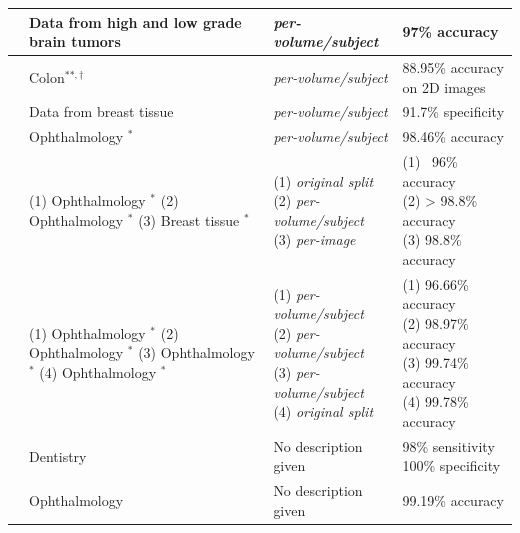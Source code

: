 \documentclass[fleqn,10pt]{wlscirep}
\begin{document}
\begin{table}[ht]
\begin{tabular}{|c|l|l|l|}
\hline
\cite{gesperger2020improved} & Data from high and low grade brain tumors & \textit{per-volume/subject} & 97\% accuracy \\
\hline
\cite{saratxaga2021characterization} & Colon$^{\ast \ast, \dagger}$ & \textit{per-volume/subject} & 88.95\% accuracy on 2D images \\
\hline
\cite{singla2019automated} & Data from breast tissue & \textit{per-volume/subject} & 91.7\% specificity \\
\hline
\cite{chetoui2020deep} & Ophthalmology \cite{kermany2018large}$^\ast$ & \textit{per-volume/subject} & 98.46\% accuracy\\
\hline
\cite{butola2020deep} & \makecell[l]{(1) Ophthalmology  \cite{kermany2018large}$^\ast$ \\(2) Ophthalmology \cite{srinivasan2014fully}$^\ast$ \\(3) Breast tissue \cite{butola2019volumetric}$^\ast$} & \makecell[l]{(1) \textit{original split} \\(2) \textit{per-volume/subject} \\(3) \textit{per-image}} & \makecell[l]{(1) ~96\% accuracy \\ (2) > 98.8\% accuracy \\ (3) 98.8\% accuracy} \\
\hline
\cite{thomas2021novel} & \makecell[l]{(1) Ophthalmology \cite{srinivasan2014fully}$^\ast$ \\ (2) Ophthalmology \cite{rasti2017macular}$^\ast$ \\ (3) Ophthalmology  \cite{farsiu2014quantitative}$^\ast$ \\ (4) Ophthalmology  \cite{kermany2018large}$^\ast$} & \makecell[l]{(1) \textit{per-volume/subject} \\ (2) \textit{per-volume/subject} \\ (3) \textit{per-volume/subject} \\ (4) \textit{original split}} & \makecell[l]{(1) 96.66\% accuracy \\ (2) 98.97\% accuracy \\ (3) 99.74\% accuracy \\ (4) 99.78\% accuracy} \\
\hline
\cite{karimian2018deep} & Dentistry & No description given & \makecell[l]{98\% sensitivity \\ 100\% specificity} \\
\hline
\cite{wang2020oct} & Ophthalmology & No description given & 99.19\% accuracy\\
\hline
\end{tabular}
\end{table}
\end{document}
